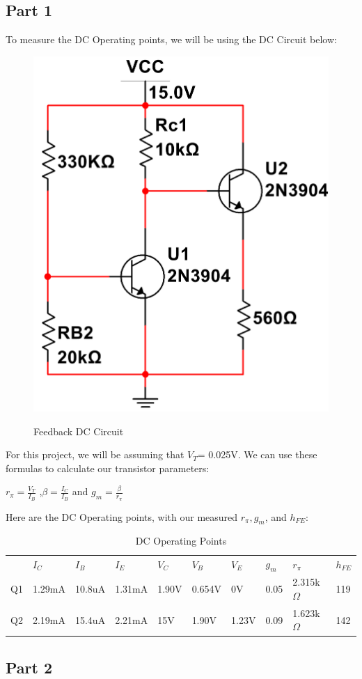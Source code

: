 \documentclass[12pt]{article}
\begin{document}
\subsection{Part 1}
To measure the DC Operating points, we will be using the DC Circuit below:
\begin{figure}[h!]
    \centering
    \includegraphics[height=0.3\textwidth]{Images/partCDC.png}\\
    \caption{Feedback DC Circuit}
    \label{fig:feedbacdccircuit}
\end{figure}
\FloatBarrier
For this project, we will be assuming that $V_T$= 0.025V. We can use these formulas to 
calculate our transistor parameters:
\begin{center}
    $r_\pi= \frac{V_T}{I_B}$ ,$\beta = \frac{I_C}{I_B}$ and $g_m = \frac{\beta}{r_\pi}$
\end{center}
Here are the DC Operating points, with our measured $r_\pi,g_m$, and $h_{FE}$:
\FloatBarrier
\begin{table}[h!]
    \centering
    \begin{tabular}{l|lllllllll}
     & $I_C$ & $I_B$ & $I_E$ & $V_C$ & $V_B$ & $V_E$ & $g_m$ & $r_\pi$ & $h_{FE}$ \\ \cline{1-10}
    Q1 & 1.29mA & 10.8uA & 1.31mA & 1.90V & 0.654V & 0V & 0.05 & 2.315k$\Omega$ & 119  \\ \cline{1-10}
    Q2 & 2.19mA & 15.4uA & 2.21mA & 15V & 1.90V & 1.23V & 0.09 & 1.623k$\Omega$ & 142
    \end{tabular}%
    \caption{DC Operating Points}
    \label{DC Operating Points}
\end{table}

\subsection{Part 2}
\end{document}
